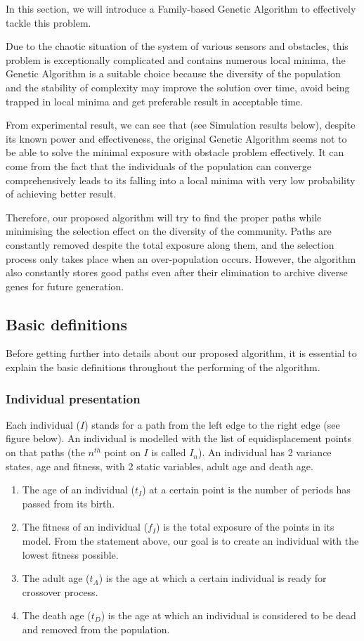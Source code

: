 \documentclass[final]{elsarticle}
\begin{document}
In this section, we will introduce a Family-based Genetic Algorithm to effectively tackle this problem.

Due to the chaotic situation of the system of various sensors and obstacles, this problem is exceptionally complicated and contains numerous local minima, the Genetic Algorithm is a suitable choice because the diversity of the population and the stability of complexity may improve the solution over time, avoid being trapped in local minima and get preferable result in acceptable time.

From experimental result, we can see that (see Simulation results below), despite its known power and effectiveness, the original Genetic Algorithm seems not to be able to solve the minimal exposure with obstacle problem effectively. It can come from the fact that the individuals of the population can converge comprehensively leads to its falling into a local minima with very low probability of achieving better result.

Therefore, our proposed algorithm will try to find the proper paths while minimising the selection effect on the diversity of the community. Paths are constantly removed despite the total exposure along them, and the selection process only takes place when an over-population occurs. However, the algorithm also constantly stores good paths even after their elimination to archive diverse genes for future generation.

\subsection{Basic definitions}

Before getting further into details about our proposed algorithm, it is essential to explain the basic definitions throughout the performing of the algorithm.

\subsubsection{Individual presentation}

Each individual ($I$) stands for a path from the left edge to the right edge (see figure below). An individual is modelled with the list of equidisplacement points on that paths (the $n^{th}$ point on $I$ is called $I_n$). An individual has 2 variance states, age and fitness, with 2 static variables, adult age and death age.
\begin{enumerate}
	\item The age of an individual ($t_I$) at a certain point is the number of periods has passed from its birth.
	\item The fitness of an individual ($f_I$) is the total exposure of the points in its model. From the statement above, our goal is to create an individual with the lowest fitness possible.
	\item The adult age ($t_A$) is the age at which a certain individual is ready for crossover process.
	\item The death age ($t_D$) is the age at which an individual is considered to be dead and removed from the population.
\end{enumerate}
\end{document}
